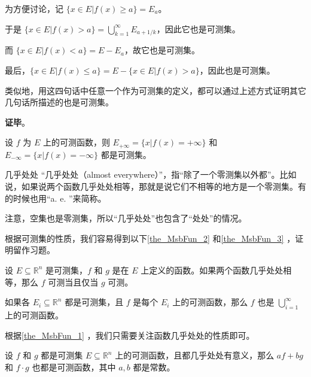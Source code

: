 为方便讨论，记 $\{x\in E|f(x)\geq a\}=E_a$。

于是 $\{x\in E|f(x)>a\}=\bigcup_{k=1}^\infty E_{a+1/k}$，因此它也是可测集。

而 $\{x\in E|f(x)<a\}=E-E_a$，故它也是可测集。

最后，$\{x\in E|f(x)\leq a\}=E-\{x\in E|f(x)>a\}$，因此也是可测集。

类似地，用这四句话中任意一个作为可测集的定义，都可以通过上述方式证明其它几句话所描述的也是可测集。

\textbf{证毕}。





\begin{corollary}{}
设 $f$ 为 $E$ 上的可测函数，则 $E_{+\infty}=\{x|f(x)=+\infty\}$ 和 $E_{-\infty}=\{x|f(x)=-\infty\}$ 都是可测集。
\end{corollary}



\begin{definition}{几乎处处}
“几乎处处（almost everywhere）”，指“除了一个零测集以外都”。比如说，如果说两个函数几乎处处相等，那就是说它们不相等的地方是一个零测集。有的时候也用“a. e. ”来简称。
\end{definition}

注意，空集也是零测集，所以“几乎处处”也包含了“处处”的情况。

根据可测集的性质，我们容易得到以下\autoref{the_MsbFun_2} 和\autoref{the_MsbFun_3} ，证明留作习题。

\begin{theorem}{}\label{the_MsbFun_2}
设 $E\subseteq\mathbb{R}^n$ 是可测集，$f$ 和 $g$ 是在 $E$ 上定义的函数。如果两个函数几乎处处相等，那么 $f$ 可测当且仅当 $g$ 可测。
\end{theorem}



\begin{theorem}{}\label{the_MsbFun_3}
如果各 $E_i\subseteq\mathbb{R}^n$ 都是可测集，且 $f$ 是每个 $E_i$ 上的可测函数，那么 $f$ 也是 $\bigcup_{i=1}^\infty$ 上的可测函数。
\end{theorem}

根据\autoref{the_MsbFun_1} ，我们只需要关注函数几乎处处的性质即可。

\begin{theorem}{}
设 $f$ 和 $g$ 都是可测集 $E\subseteq\mathbb{R}^n$ 上的可测函数，且都几乎处处有意义，那么 $af+bg$ 和 $f\cdot g$ 也都是可测函数，其中 $a, b$ 都是常数。
\end{theorem}

